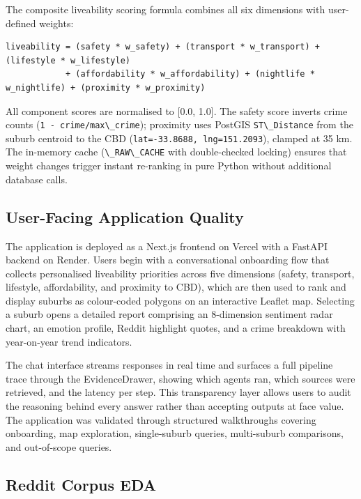 \documentclass[11pt,a4paper]{article}
\newcommand{\passthrough}[1]{#1}
\begin{document}
The composite liveability scoring formula combines all six dimensions with user-defined weights:

\begin{lstlisting}
liveability = (safety * w_safety) + (transport * w_transport) + (lifestyle * w_lifestyle)
            + (affordability * w_affordability) + (nightlife * w_nightlife) + (proximity * w_proximity)
\end{lstlisting}

All component scores are normalised to {[}0.0, 1.0{]}. The safety score inverts crime counts (\passthrough{\lstinline!1 - crime/max\_crime!}); proximity uses PostGIS \passthrough{\lstinline!ST\_Distance!} from the suburb centroid to the CBD (\passthrough{\lstinline!lat=-33.8688, lng=151.2093!}), clamped at 35 km. The in-memory cache (\passthrough{\lstinline!\_RAW\_CACHE!} with double-checked locking) ensures that weight changes trigger instant re-ranking in pure Python without additional database calls.

\subsection{User-Facing Application Quality}\label{63-user-facing-application-quality}

The application is deployed as a Next.js frontend on Vercel with a FastAPI backend on Render. Users begin with a conversational onboarding flow that collects personalised liveability priorities across five dimensions (safety, transport, lifestyle, affordability, and proximity to CBD), which are then used to rank and display suburbs as colour-coded polygons on an interactive Leaflet map. Selecting a suburb opens a detailed report comprising an 8-dimension sentiment radar chart, an emotion profile, Reddit highlight quotes, and a crime breakdown with year-on-year trend indicators.

The chat interface streams responses in real time and surfaces a full pipeline trace through the EvidenceDrawer, showing which agents ran, which sources were retrieved, and the latency per step. This transparency layer allows users to audit the reasoning behind every answer rather than accepting outputs at face value. The application was validated through structured walkthroughs covering onboarding, map exploration, single-suburb queries, multi-suburb comparisons, and out-of-scope queries.

\subsection{Reddit Corpus EDA}\label{64-reddit-corpus-eda}
\end{document}
